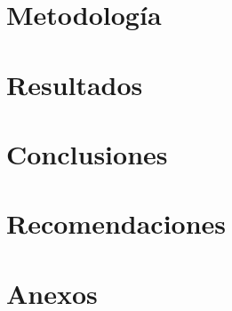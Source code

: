 \documentclass[10pt, letterpaper]{report}
\newcommand{\defaultparformat}[1]{
	{\setlength{\parskip}{2ex}
    }
}
\begin{document}
\ifdefined\CAPmetodologia
	\newpage
	\chapter{Metodología}
	\ifdefined\parpordefecto
		\defaultparformat{metodologia}
	\else
		
	\fi
\fi


\ifdefined\CAPresultados
	\newpage
	\chapter{Resultados}
	\ifdefined\parpordefecto
		\defaultparformat{resultados}
	\else
		
	\fi
\fi

\ifdefined\CAPconclusiones
	\newpage
	\chapter{Conclusiones}
	\ifdefined\parpordefecto
		\defaultparformat{conclusiones}
	\else
		
	\fi
\fi

\ifdefined\CAPrecomendaciones
	\newpage
	\chapter{Recomendaciones}
	\ifdefined\parpordefecto
		\defaultparformat{recomendaciones}
	\else
		
	\fi
\fi

\ifdefined\CAPbibliografia
	\newpage
    \cleardoublepage{}
	\ifdefined\usarAPA
		
	\else
		
	\fi
	
\fi

\ifdefined\CAPanexos
	\newpage
	\chapter*{Anexos} %
	\ifdefined\parpordefecto
		\defaultparformat{anexos}
	\else
		
	\fi
\fi
\end{document}
